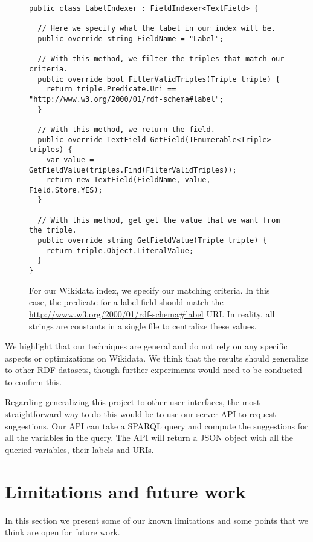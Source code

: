 \begin{figure}[H]
\begin{verbatim}
public class LabelIndexer : FieldIndexer<TextField> {

  // Here we specify what the label in our index will be.
  public override string FieldName = "Label";

  // With this method, we filter the triples that match our criteria.
  public override bool FilterValidTriples(Triple triple) {
    return triple.Predicate.Uri == "http://www.w3.org/2000/01/rdf-schema#label";
  }

  // With this method, we return the field.
  public override TextField GetField(IEnumerable<Triple> triples) {
    var value = GetFieldValue(triples.Find(FilterValidTriples));
    return new TextField(FieldName, value, Field.Store.YES);
  }

  // With this method, get get the value that we want from the triple.
  public override string GetFieldValue(Triple triple) {
    return triple.Object.LiteralValue;
  }
}
\end{verbatim}
\caption{For our Wikidata index, we specify our matching criteria. In this case, the predicate for a label field should match the \url{http://www.w3.org/2000/01/rdf-schema\#label} URI. In reality, all strings are constants in a single file to centralize these values.}
\label{fig:extendingIndex}
\end{figure}

We highlight that our techniques are general and do not rely on any specific aspects or optimizations on Wikidata. We think that the results should generalize to other RDF datasets, though further experiments would need to be conducted to confirm this.

Regarding generalizing this project to other user interfaces, the most straightforward way to do this would be to use our server API to request suggestions.
Our API can take a SPARQL query and compute the suggestions for all the variables in the query. The API will return a JSON object with all the queried variables, their labels and URIs.

\section{Limitations and future work}
\label{chap:futureWork}

In this section we present some of our known limitations and some points that we think are open for future work.

